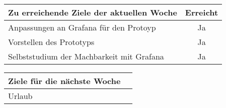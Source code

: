 \begin{tabularx}{\textwidth}{Xc}
    \arrayrulecolor{OliveGreen}
    \toprule
    {\bfseries Zu erreichende Ziele der aktuellen Woche} & {\bfseries Erreicht} \\
    \midrule[2pt]
    Anpassungen an Grafana für den Protoyp               &Ja                    \\
    \rowcolor{OliveGreen!15}
    Vorstellen des Prototyps                             &Ja                    \\
    \rowcolor{OliveGreen!15}
    Selbststudium der Machbarkeit mit Grafana            &Ja                    \\
   \bottomrule[2pt]
\end{tabularx}
%
\vspace{1cm}
%
\begin{tabularx}{\textwidth}{Xc}
    \arrayrulecolor{OliveGreen}
    \toprule
    {\bfseries Ziele für die nächste Woche}              &                      \\
    \midrule[2pt]
    Urlaub                                               &                      \\
\end{tabularx}
